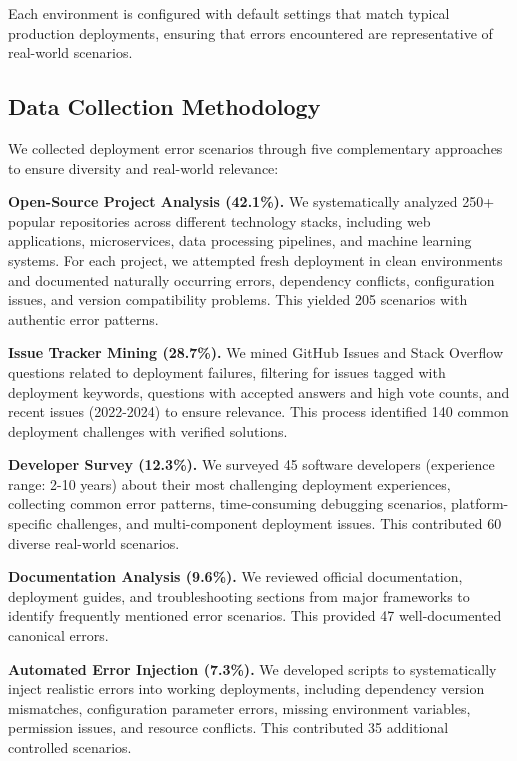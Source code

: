 Each environment is configured with default settings that match typical production deployments, ensuring that errors encountered are representative of real-world scenarios.

\subsection{Data Collection Methodology}\label{sec:data-collection}

We collected deployment error scenarios through five complementary approaches to ensure diversity and real-world relevance:

\textbf{Open-Source Project Analysis (42.1\%).} We systematically analyzed 250+ popular repositories across different technology stacks, including web applications, microservices, data processing pipelines, and machine learning systems. For each project, we attempted fresh deployment in clean environments and documented naturally occurring errors, dependency conflicts, configuration issues, and version compatibility problems. This yielded 205 scenarios with authentic error patterns.

\textbf{Issue Tracker Mining (28.7\%).} We mined GitHub Issues and Stack Overflow questions related to deployment failures, filtering for issues tagged with deployment keywords, questions with accepted answers and high vote counts, and recent issues (2022-2024) to ensure relevance. This process identified 140 common deployment challenges with verified solutions.

\textbf{Developer Survey (12.3\%).} We surveyed 45 software developers (experience range: 2-10 years) about their most challenging deployment experiences, collecting common error patterns, time-consuming debugging scenarios, platform-specific challenges, and multi-component deployment issues. This contributed 60 diverse real-world scenarios.

\textbf{Documentation Analysis (9.6\%).} We reviewed official documentation, deployment guides, and troubleshooting sections from major frameworks to identify frequently mentioned error scenarios. This provided 47 well-documented canonical errors.

\textbf{Automated Error Injection (7.3\%).} We developed scripts to systematically inject realistic errors into working deployments, including dependency version mismatches, configuration parameter errors, missing environment variables, permission issues, and resource conflicts. This contributed 35 additional controlled scenarios.

